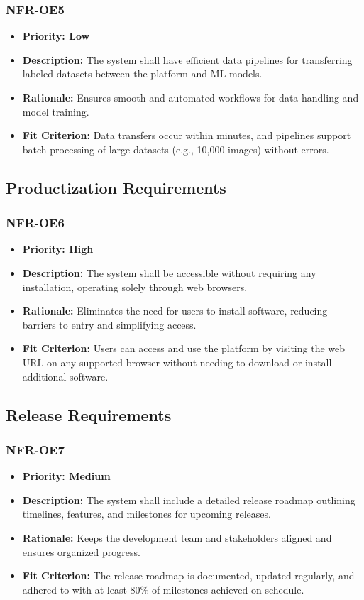 \documentclass[12pt]{article}
\begin{document}
\subsubsection*{NFR-OE5}
\label{sec:OE5}
\begin{itemize}
  \item \textbf{Priority: Low}
  \item \textbf{Description:} The system shall have efficient data pipelines for transferring labeled datasets between the platform and ML models.
  \item \textbf{Rationale:} Ensures smooth and automated workflows for data handling and model training.
  \item \textbf{Fit Criterion:} Data transfers occur within minutes, and pipelines support batch processing of large datasets (e.g., 10,000 images) without errors.
\end{itemize}
\subsection{Productization Requirements}
\subsubsection*{NFR-OE6}
\label{sec:OE6}
\begin{itemize}
  \item \textbf{Priority: High}
  \item \textbf{Description:} The system shall be accessible without requiring any installation, operating solely through web browsers.
  \item \textbf{Rationale:} Eliminates the need for users to install software, reducing barriers to entry and simplifying access.
  \item \textbf{Fit Criterion:} Users can access and use the platform by visiting the web URL on any supported browser without needing to download or install additional software.
\end{itemize}
\subsection{Release Requirements}
\subsubsection*{NFR-OE7}
\label{sec:OE7}
\begin{itemize}
  \item \textbf{Priority: Medium}
  \item \textbf{Description:} The system shall include a detailed release roadmap outlining timelines, features, and milestones for upcoming releases.
  \item \textbf{Rationale:} Keeps the development team and stakeholders aligned and ensures organized progress.
  \item \textbf{Fit Criterion:} The release roadmap is documented, updated regularly, and adhered to with at least 80\% of milestones achieved on schedule.
\end{itemize}
\end{document}
